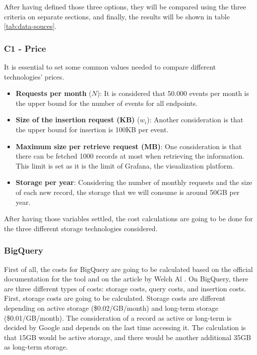 \documentclass[english, 12pt, a4paper, sci, utf8, a-1b, online]{aaltothesis}
\begin{document}
After having defined those three options, they will be compared using the three criteria on separate sections, and finally, the results will be shown in table \ref{tab:data-souces}.

\subsubsection*{C1 - Price}

It is essential to set some common values needed to compare different technologies' prices.

\begin{itemize}
    \item \textbf{Requests per month} ($N$): It is considered that 50.000 events per month is the upper bound for the number of events for all endpoints.
    \item \textbf{Size of the insertion request (KB)} ($w_i$): Another consideration is that the upper bound for insertion is 100KB per event.
    \item \textbf{Maximum size per retrieve request (MB)}: One consideration is that there can be fetched 1000 records at most when retrieving the information. This limit is set as it is the limit of Grafana, the visualization platform.
    \item \textbf{Storage per year}: Considering the number of monthly requests and the size of each new record, the storage that we will consume is around 50GB per year.
\end{itemize}

After having those variables settled, the cost calculations are going to be done for the three different storage technologies considered.

\subsubsection*{BigQuery}

First of all, the costs for BigQuery are going to be calculated based on the official documentation for the tool \cite{BigQueryDocsPricing} and on the article by Welch Al \cite{BigQueryCosts}. On BigQuery, there are three different types of costs: storage costs, query costs, and insertion costs.\\

First, storage costs are going to be calculated. Storage costs are different depending on active storage (\$0.02/GB/month) and long-term storage (\$0.01/GB/month). The consideration of a record as active or long-term is decided by Google and depends on the last time accessing it. The calculation is that 15GB would be active storage, and there would be another additional 35GB as long-term storage.
\end{document}
